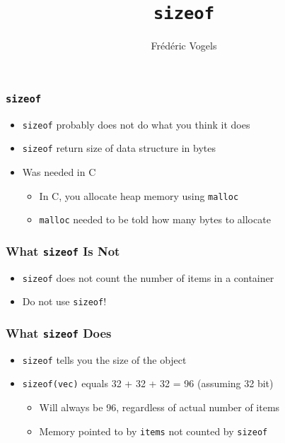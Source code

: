 
\usetikzlibrary{shadows,shapes.multipart}

\title{\texttt{sizeof}}
\author{Fr\'ed\'eric Vogels}




\begin{frame}
  \titlepage
\end{frame}

\begin{frame}
  \frametitle{\texttt{sizeof}}
  \begin{itemize}
    \item \texttt{sizeof} probably does not do what you think it does
    \item \texttt{sizeof} return size of data structure in bytes
    \item Was needed in C
          \begin{itemize}
            \item In C, you allocate heap memory using \texttt{malloc}
            \item \texttt{malloc} needed to be told how many bytes to allocate
          \end{itemize}
  \end{itemize}
\end{frame}

\begin{frame}
  \frametitle{What \texttt{sizeof} Is Not}
  \begin{itemize}
    \item \texttt{sizeof} does not count the number of items in a container
    \item Do not use \texttt{sizeof}!
  \end{itemize}
\end{frame}

\begin{frame}
  \frametitle{What \texttt{sizeof} Does}
  \begin{itemize}
    \item \texttt{sizeof} tells you the size of the object
    \item \texttt{sizeof(vec)} equals 32 + 32 + 32 = 96 (assuming 32 bit)
          \begin{itemize}
            \item Will always be 96, regardless of actual number of items
            \item Memory pointed to by \texttt{items} not counted by \texttt{sizeof}
          \end{itemize}
  \end{itemize}
\end{frame}


